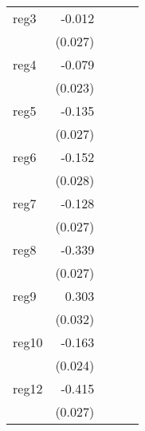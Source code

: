 {\begin{longtable}{l*{4}{D{.}{.}{-1}}}
\addlinespace
reg3        &      -0.012         &                     &                     &                     \\
            &     (0.027)         &                     &                     &                     \\
\addlinespace
reg4        &      -0.079\sym{***}&                     &                     &                     \\
            &     (0.023)         &                     &                     &                     \\
\addlinespace
reg5        &      -0.135\sym{***}&                     &                     &                     \\
            &     (0.027)         &                     &                     &                     \\
\addlinespace
reg6        &      -0.152\sym{***}&                     &                     &                     \\
            &     (0.028)         &                     &                     &                     \\
\addlinespace
reg7        &      -0.128\sym{***}&                     &                     &                     \\
            &     (0.027)         &                     &                     &                     \\
\addlinespace
reg8        &      -0.339\sym{***}&                     &                     &                     \\
            &     (0.027)         &                     &                     &                     \\
\addlinespace
reg9        &       0.303\sym{***}&                     &                     &                     \\
            &     (0.032)         &                     &                     &                     \\
\addlinespace
reg10       &      -0.163\sym{***}&                     &                     &                     \\
            &     (0.024)         &                     &                     &                     \\
\addlinespace
reg12       &      -0.415\sym{***}&                     &                     &                     \\
            &     (0.027)         &                     &                     &                     \\

\end{longtable}}
